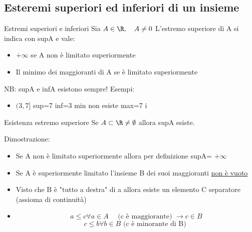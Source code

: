
\subsection{Esteremi superiori ed inferiori di un insieme}
\begin{definizione}{Estremi superiori e inferiori}
	Sia $A  \in \R, \quad A \neq 0$ L'estremo superiore di A si indica con supA e vale:
	\begin{itemize}
		\item $ + \infty$ se A non è limitato superiormente
		\item Il minimo dei maggioranti di A se è limitato superiormente
	\end{itemize}
\end{definizione}
NB: supA e infA esistono sempre!
Esempi:
\begin{itemize}
	\item $(3,7]$  \quad sup=7 \quad inf=3 \quad min non esiste \quad max=7
	      i
\end{itemize}
\begin{teorema}{Esistenza estremo superiore}
	Se $A \subset \R \neq \emptyset $ allora supA esiste.
\end{teorema}
Dimostrazione:
\begin{itemize}
	\item Se A non è limitato superiormente allora per definizione supA= $+\infty$
	\item Se A è superiormente limitato l'insieme B dei suoi maggioranti \underline{non è vuoto}
	\item Visto che B è "tutto a destra" di a allora esiste un elemento C separatore (assioma di continuità)
	\item \[
		      a \le c \forall a  \in  A \quad \text{ (c è maggiorante) }\rightarrow c \in B
	      \]
	      \[
		      c \le b \forall b  \in  B \text{ (c è minorante di B) }
	      \]
\end{itemize}

